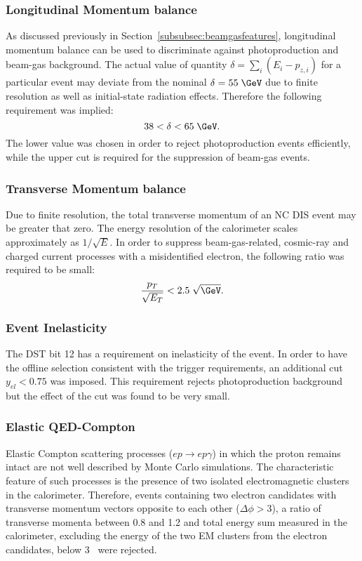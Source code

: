 \subsubsection{Longitudinal Momentum balance}
\label{subsubsec:empzcut}
As discussed previously in Section~\ref{subsubsec:beamgasfeatures}, longitudinal momentum balance can be used to discriminate against photoproduction and beam-gas background. The actual value of quantity $\delta=\sum_i{\left(E_i-p_{z,i}\right)}$ for a particular event may deviate from the nominal $\delta=55\;\GeV$ due to finite resolution as well as initial-state radiation effects. Therefore the following requirement was implied:
\begin{equation}
38 < \delta < 65\;\GeV.
\label{eq:epmzcut}
\end{equation}
The lower value was chosen in order to reject photoproduction events efficiently, while the upper cut is required for the suppression of beam-gas events.

\subsubsection{Transverse Momentum balance}
\label{subsubsec:empzcut}
Due to finite resolution, the total transverse momentum of an NC DIS event may be greater that zero. The energy resolution of the calorimeter scales approximately as $1/\sqrt{E}$. In order to suppress beam-gas-related, cosmic-ray and charged current processes with a misidentified electron, the following ratio was required to be small:
\begin{equation}
\frac{p_T}{\sqrt{E_T}} < 2.5\;\sqrt{\GeV}.
\label{eq:ptcut}
\end{equation}

\subsubsection{Event Inelasticity}
\label{subsubsec:yelcut}

The DST bit 12 has a requirement on inelasticity of the event. In order to have the offline selection consistent with the trigger requirements, an additional cut $y_{el} < 0.75$ was imposed. This requirement rejects photoproduction background but the effect of the cut was found to be very small.

\subsubsection{Elastic QED-Compton}
\label{subsubsec:elasticqedcut}
Elastic Compton scattering processes ($ep \rightarrow ep\gamma$) in which the proton remains intact are not well described by Monte Carlo simulations. The characteristic feature of such processes is the presence of two isolated electromagnetic clusters in the calorimeter. Therefore, events containing two electron candidates with transverse momentum vectors opposite to each other ($\Delta\phi > 3$), a ratio of transverse momenta between 0.8 and 1.2 and total energy sum measured in the calorimeter, excluding the energy of the two EM clusters from the electron candidates, below 3 \GeV~were rejected.

